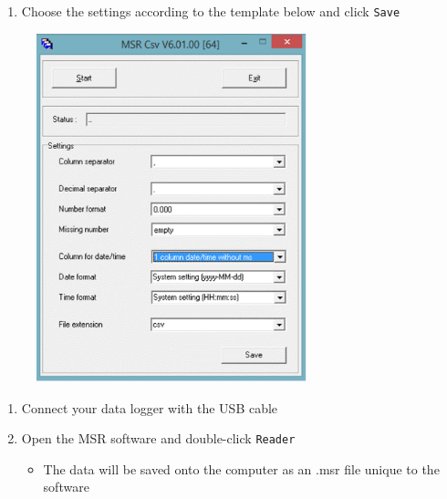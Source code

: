 \documentclass[
  letterpaper,
  DIV=11,
  numbers=noendperiod]{scrreprt}
\providecommand{\tightlist}{%
  \setlength{\itemsep}{0pt}\setlength{\parskip}{0pt}}\usepackage{longtable,booktabs,array}
\begin{document}
\begin{enumerate}
\def\labelenumi{\arabic{enumi}.}
\setcounter{enumi}{1}
\tightlist
\item
  Choose the settings according to the template below and click
  \texttt{Save}
\end{enumerate}

\begin{figure}

{\centering \includegraphics[width=0.7\textwidth,height=\textheight]{chapters/figs/MSRExportStep2.png}

}

\end{figure}

\begin{enumerate}
\def\labelenumi{\arabic{enumi}.}
\setcounter{enumi}{2}
\tightlist
\item
  Connect your data logger with the USB cable
\item
  Open the MSR software and double-click \texttt{Reader}

  \begin{itemize}
  \tightlist
  \item
    The data will be saved onto the computer as an .msr file unique to
    the software
  \end{itemize}
\end{enumerate}
\end{document}
